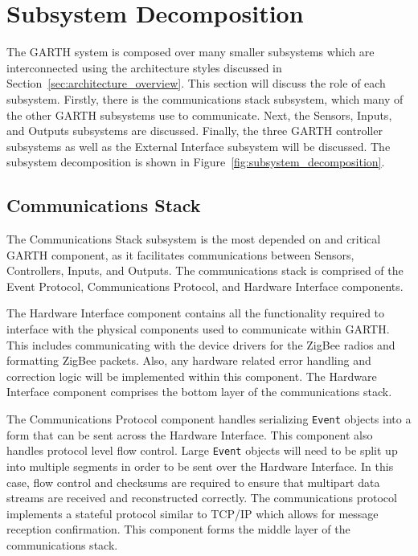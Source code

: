 \documentclass{report}
\begin{document}
\section{Subsystem Decomposition}


The GARTH system is composed over many smaller subsystems which are
interconnected using the architecture styles discussed in
Section~\ref{sec:architecture_overview}. This section will discuss the
role of each subsystem. Firstly, there is the communications stack
subsystem, which many of the other GARTH subsystems use to
communicate. Next, the Sensors, Inputs, and Outputs subsystems are
discussed. Finally, the three GARTH controller subsystems as well as
the External Interface subsystem will be discussed.  The subsystem
decomposition is shown in Figure~\ref{fig:subsystem_decomposition}.

\subsection{Communications Stack}

The Communications Stack subsystem is the most depended on and critical
GARTH component, as it facilitates communications between Sensors,
Controllers, Inputs, and Outputs. The communications stack is
comprised of the Event Protocol, Communications Protocol, and Hardware
Interface components.

The Hardware Interface component contains all the
functionality required to interface with the physical components used
to communicate within GARTH. This includes communicating with the
device drivers for the ZigBee radios and formatting ZigBee packets.
Also, any hardware related error handling and correction logic will be
implemented within this component. The Hardware Interface component
comprises the bottom layer of the communications stack.

The Communications Protocol component handles serializing \texttt{Event}
objects into a form that can be sent across the Hardware
Interface. This component also handles protocol level flow
control. Large \texttt{Event} objects will need to be split up into multiple
segments in order to be sent over the Hardware Interface. In this
case, flow control and checksums are required to ensure that multipart
data streams are received and reconstructed correctly. The
communications protocol implements a stateful protocol similar to
TCP/IP which allows for message reception confirmation. This component
forms the middle layer of the communications stack.
\end{document}
